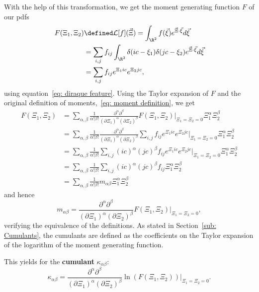 With the help of this transformation, we get the moment generating function $F$ of our \glspl{pdf}
\begin{equation}
  \label{eq:Definition of F}
  \begin{aligned}
    F(\Xi_1, \Xi_2) & \defined \mathcal{L}[f](\vec{\Xi}) = \int_{\R^2} f(\vec{\xi}) e^{\vec{\Xi} \cdot \vec{\xi}}d\vec{\xi} \\
     & = \sum_{i,j}f_{ij} \int_{\R^2} \delta(ic - \xi_1)\delta(jc - \xi_2) e^{\vec{\Xi} \cdot \vec{\xi}}d\vec{\xi}
  \\
     & = \sum_{i,j}f_{ij} e^{\Xi_1 ic} e^{\Xi_2 jc},
  \end{aligned}
\end{equation}
using equation~\eqref{eq: diraque feature}.
Using the Taylor expansion of $F$ and the original definition of moments,~\eqref{eq: moment definition}, we get
\begin{equation*}
  \label{eq: taylor of F}
  \begin{aligned}
    F(\Xi_1, \Xi_2) & = \sum_{\alpha,\beta} \frac{1}{\alpha!\beta!} \frac{\partial^\alpha\partial^\beta}{{(\partial \Xi_1)}^\alpha{(\partial \Xi_2)}^\beta} F(\Xi_1, \Xi_2)\Bigr|_{\Xi_1=\Xi_2 = 0} \Xi_1^\alpha \Xi_2^\beta \\
    & = \sum_{\alpha,\beta} \frac{1}{\alpha!\beta!} \frac{\partial^\alpha\partial^\beta}
      {{(\partial \Xi_1)}^\alpha{(\partial \Xi_2)}^\beta}  \sum_{i,j} f_{ij} e^{\Xi_1 ic} e^{\Xi_2 jc} \Bigr|_{\Xi_1=\Xi_2 = 0} \Xi_1^\alpha \Xi_2^\beta \\
    & = \sum_{\alpha,\beta} \frac{1}{\alpha!\beta!}
    \sum_{i,j}  {(ic)}^\alpha {(jc)}^\beta f_{ij} e^{\Xi_1 ic} e^{\Xi_2 jc} \Bigr|_{\Xi_1=\Xi_2 = 0} \Xi_1^\alpha \Xi_2^\beta \\
    & = \sum_{\alpha,\beta} \frac{1}{\alpha!\beta!}
    \sum_{i,j} {(ic)}^\alpha {(jc)}^\beta f_{ij} \Xi_1^\alpha \Xi_2^\beta \\
    & = \sum_{\alpha,\beta} \frac{1}{\alpha!\beta!} m_{\alpha\beta} \Xi_1^\alpha \Xi_2^\beta
  \end{aligned}
\end{equation*}
and hence
\begin{equation}
  \label{eq: alternative representation of moments}
  m_{\alpha\beta} = \frac{\partial^\alpha\partial^\beta}{{(\partial \Xi_1)}^\alpha{(\partial \Xi_2)}^\beta} F(\Xi_1, \Xi_2)\Bigr|_{\Xi_1=\Xi_2 = 0},
\end{equation}
verifying the equivalence of the definitions.
As stated in Section~\ref{sub: Cumulants}, the cumulants are defined as the coefficients on the Taylor expansion of the logarithm of the moment generating function.

This yields for the \textbf{cumulant} $\kappa_{\alpha\beta}$:
\begin{equation}
  \label{eq: definition of cumulants}
  \kappa_{\alpha\beta} = \frac{\partial^\alpha\partial^\beta}{{(\partial \Xi_1)}^\alpha{(\partial \Xi_2)}^\beta} \ln(F(\Xi_1, \Xi_2))\Bigr|_{\Xi_1=\Xi_2 = 0}.
\end{equation}
